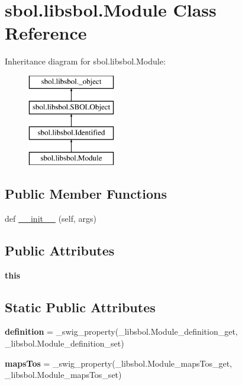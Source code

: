 \hypertarget{classsbol_1_1libsbol_1_1_module}{}\section{sbol.\+libsbol.\+Module Class Reference}
\label{classsbol_1_1libsbol_1_1_module}
Inheritance diagram for sbol.\+libsbol.\+Module\+:\begin{figure}[H]
\begin{center}
\leavevmode
\includegraphics[height=4.000000cm]{classsbol_1_1libsbol_1_1_module}
\end{center}
\end{figure}
\subsection*{Public Member Functions}
\begin{DoxyCompactItemize}
\item 
def \hyperlink{classsbol_1_1libsbol_1_1_module_ac825ddb96ad640999b3171f4d93a3712}{\+\_\+\+\_\+init\+\_\+\+\_\+} (self, args)
\end{DoxyCompactItemize}
\subsection*{Public Attributes}
\begin{DoxyCompactItemize}
\item 
{\bfseries this}\hypertarget{classsbol_1_1libsbol_1_1_module_a914a35bbc2bb00f441892ef5eeab5a0f}{}\label{classsbol_1_1libsbol_1_1_module_a914a35bbc2bb00f441892ef5eeab5a0f}

\end{DoxyCompactItemize}
\subsection*{Static Public Attributes}
\begin{DoxyCompactItemize}
\item 
{\bfseries definition} = \+\_\+swig\+\_\+property(\+\_\+libsbol.\+Module\+\_\+definition\+\_\+get, \+\_\+libsbol.\+Module\+\_\+definition\+\_\+set)\hypertarget{classsbol_1_1libsbol_1_1_module_a98e92fdf926f872c91f69b7f92bbe11e}{}\label{classsbol_1_1libsbol_1_1_module_a98e92fdf926f872c91f69b7f92bbe11e}

\item 
{\bfseries maps\+Tos} = \+\_\+swig\+\_\+property(\+\_\+libsbol.\+Module\+\_\+maps\+Tos\+\_\+get, \+\_\+libsbol.\+Module\+\_\+maps\+Tos\+\_\+set)\hypertarget{classsbol_1_1libsbol_1_1_module_a7710fec04decd56eda791d067145ba5c}{}\label{classsbol_1_1libsbol_1_1_module_a7710fec04decd56eda791d067145ba5c}

\end{DoxyCompactItemize}


